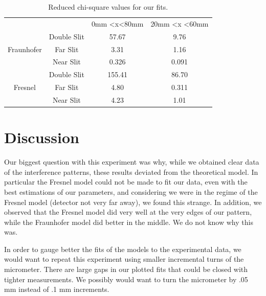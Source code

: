 \documentclass[prb,preprint]{revtex4-1}
\begin{document}
\begin{table}[h!]
\centering
\caption{Reduced chi-square values for our fits. }
\begin{ruledtabular}
\begin{tabular}{cccc}
                            &             & 0mm \textless x\textless 80mm & 20mm \textless x \textless 60mm \\
\multirow{3}{*}{Fraunhofer} & Double Slit &57.67                      & 9.76                         \\
                            & Far Slit    & 3.31                       & 1.16                        \\
                            & Near Slit   & 0.326                       &        0.091           \\
\multirow{3}{*}{Fresnel}    & Double Slit &          155.41               & 86.70                         \\
                            & Far Slit    & 4.80                       & 0.311                         \\
                            & Near Slit   & 4.23                       &1.01                       
\end{tabular}
\end{ruledtabular}
\label{chi-square}
\end{table}


\section{Discussion}

Our biggest question with this experiment was why, while we obtained clear data of the interference patterns, these results deviated from the theoretical model.  In particular the Fresnel model could not be made to fit our data, even with the best estimations of our parameters, and considering we were in the regime of the Fresnel model (detector not very far away), we found this strange. In addition, we observed that the Fresnel model did very well at the very edges of our pattern, while the Fraunhofer model did better in the middle.  We do not know why this was.  

In order to gauge better the fits of the models to the experimental data, we would want to repeat this experiment using smaller incremental turns of the micrometer.  There are large gaps in our plotted fits that could be closed with tighter measurements.  We possibly would want to turn the micrometer by .05 mm instead of .1 mm increments.  
\end{document}

